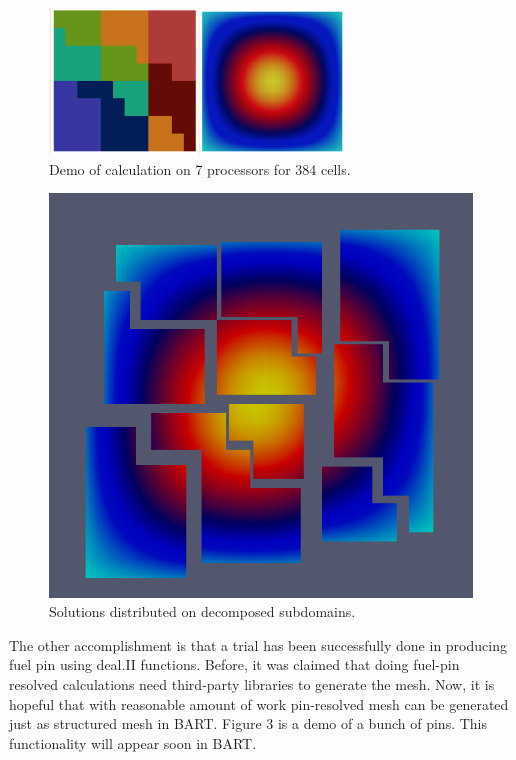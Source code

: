 \documentclass{article}
\begin{document}
\begin{figure}
	\centering
	\includegraphics[width=0.7\textwidth]{solu.png}
	\caption{Demo of calculation on 7 processors for 384 cells.}
\end{figure}
\begin{figure}
	\centering
	\includegraphics[width=.6\textwidth]{decomp-solu.png}
	\caption{Solutions distributed on decomposed subdomains.}
\end{figure}

The other accomplishment is that a trial has been successfully done in producing fuel 
pin using deal.II functions. Before, it was claimed that doing fuel-pin resolved calculations need third-party libraries to generate the mesh. Now, it is hopeful that
with reasonable amount of work pin-resolved mesh can be generated just as structured mesh in BART. Figure 3 is a demo of a bunch of  pins. This functionality will appear soon in BART.
\end{document}
